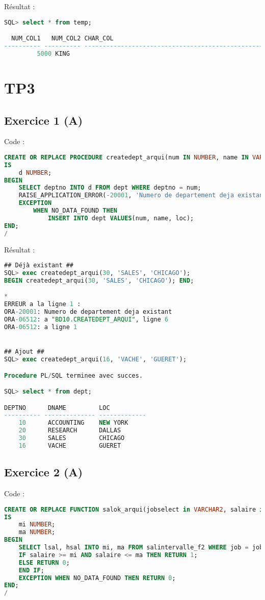 \documentclass{article}
\begin{document}
Résultat :
\begin{lstlisting}[language=SQL,
    morekeywords={DECLARE, LOOP, TYPE, FOR, IF, IS, OPEN, FETCH, DBMS_OUTPUT, PUT_LINE}]
SQL> select * from temp;

  NUM_COL1   NUM_COL2 CHAR_COL
---------- ---------- -------------------------------------------------------
		 5000 KING
\end{lstlisting}

\newpage
\section{TP3}
\subsection{Exercice 1 (A)}
Code :
\begin{lstlisting}[language=SQL,
    deletekeywords={char},
    morekeywords={DECLARE, LOOP, TYPE, FOR, IF, IS, OPEN, FETCH, DBMS_OUTPUT, PUT_LINE}]
CREATE OR REPLACE PROCEDURE createdept_arqui(num IN NUMBER, name IN VARCHAR2, loc IN VARCHAR2)
IS
    d NUMBER;
BEGIN
    SELECT deptno INTO d FROM dept WHERE deptno = num;
    RAISE_APPLICATION_ERROR(-20001, 'Numero de departement deja existant');
    EXCEPTION 
        WHEN NO_DATA_FOUND THEN
            INSERT INTO dept VALUES(num, name, loc);
END;
/
\end{lstlisting}

Résultat :
\begin{lstlisting}[language=SQL,
    morekeywords={DECLARE, LOOP, TYPE, FOR, IF, IS, OPEN, FETCH, DBMS_OUTPUT, PUT_LINE}]
## Déjà existant ##
SQL> exec createdept_arqui(30, 'SALES', 'CHICAGO');
BEGIN createdept_arqui(30, 'SALES', 'CHICAGO'); END;

*
ERREUR a la ligne 1 :
ORA-20001: Numero de departement deja existant
ORA-06512: a "BD10.CREATEDEPT_ARQUI", ligne 6
ORA-06512: a ligne 1


## Ajout ##
SQL> exec createdept_arqui(16, 'VACHE', 'GUERET');

Procedure PL/SQL terminee avec succes.

SQL> select * from dept;

DEPTNO 	    DNAME	      LOC
---------- -------------- -------------
    10 		ACCOUNTING	  NEW YORK
    20 		RESEARCH	  DALLAS
    30 		SALES	      CHICAGO
    16 		VACHE	      GUERET    
\end{lstlisting}

\subsection{Exercice 2 (A)}
Code :
\begin{lstlisting}[language=SQL,
    deletekeywords={char},
    morekeywords={DECLARE, LOOP, TYPE, FOR, IF, IS, OPEN, FETCH, DBMS_OUTPUT, PUT_LINE}]
CREATE OR REPLACE FUNCTION salok_arqui(jobselect in VARCHAR2, salaire in NUMBER) RETURN NUMBER 
IS
    mi NUMBER;
    ma NUMBER;
BEGIN
    SELECT lsal, hsal INTO mi, ma FROM salintervalle_f2 WHERE job = jobselect;
    IF salaire >= mi AND salaire <= ma THEN RETURN 1; 
    ELSE RETURN 0;
    END IF;
    EXCEPTION WHEN NO_DATA_FOUND THEN RETURN 0;
END;
/
\end{lstlisting}
\end{document}
